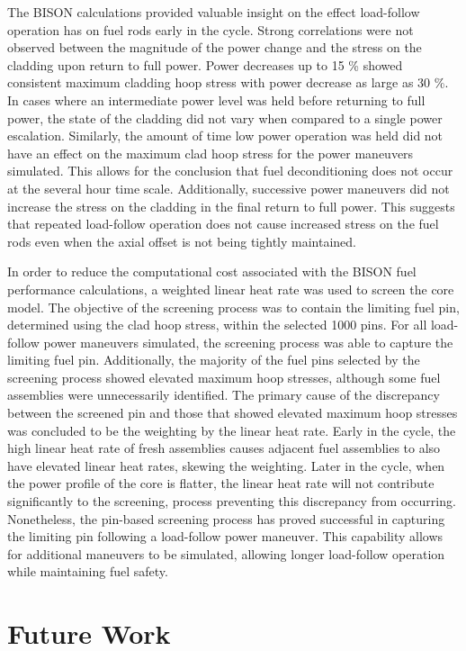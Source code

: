 \documentclass[edeposit,fullpage,11pt]{uiucthesis2009}
\begin{document}
The BISON calculations provided valuable insight on the effect load-follow operation has on fuel rods early in the cycle.
Strong correlations were not observed between the magnitude of the power change and the stress on the cladding upon return to full power.
Power decreases up to 15 \% showed consistent maximum cladding hoop stress with power decrease as large as 30 \%.
In cases where an intermediate power level was held before returning to full power, the state of the cladding did not vary when compared to a single power escalation.
Similarly, the amount of time low power operation was held did not have an effect on the maximum clad hoop stress for the power maneuvers simulated.
This allows for the conclusion that fuel deconditioning does not occur at the several hour time scale.
Additionally, successive power maneuvers did not increase the stress on the cladding in the final return to full power.
This suggests that repeated load-follow operation does not cause increased stress on the fuel rods even when the axial offset is not being tightly maintained.

In order to reduce the computational cost associated with the BISON fuel performance calculations, a weighted linear heat rate was used to screen the core model.
The objective of the screening process was to contain the limiting fuel pin, determined using the clad hoop stress, within the selected 1000 pins.
For all load-follow power maneuvers simulated, the screening process was able to capture the limiting fuel pin.
Additionally, the majority of the fuel pins selected by the screening process showed elevated maximum hoop stresses, although some fuel assemblies were unnecessarily identified.
The primary cause of the discrepancy between the screened pin and those that showed elevated maximum hoop stresses was concluded to be the weighting by the linear heat rate.
Early in the cycle, the high linear heat rate of fresh assemblies causes adjacent fuel assemblies to also have elevated linear heat rates, skewing the weighting. 
Later in the cycle, when the power profile of the core is flatter, the linear heat rate will not contribute significantly to the screening, process preventing this discrepancy from occurring. 
Nonetheless, the pin-based screening process has proved successful in capturing the limiting pin following a load-follow power maneuver. 
This capability allows for additional maneuvers to be simulated, allowing longer load-follow operation while maintaining fuel safety.

\section{Future Work}
\end{document}
